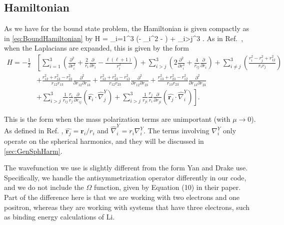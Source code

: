 \documentclass[Dissertation.tex]{subfiles}
\begin{document}
\subsection{Hamiltonian}
\label{sec:GenShortHam}
As we have for the bound state problem, the Hamiltonian is given compactly
as in \cref{eq:BoundHamiltonian} by
\beq
\label{eq:GenHam1}
H = \sum_{i=1}^3 \left(- \nabla_i^2 -  \right) + \sum_{i>j}^3 .
\eeq
As in Ref.~\cite{Yan1997}, when the Laplacians are expanded, this is given by
the form
\begin{align}
\label{eq:GenHam2}
\nonumber H = -\frac{1}{2} & \left[ \sum_{i=1}^3 \left( \frac{\partial^2}{\partial r_i^2} + \frac{2}{r_i} \frac{\partial}{\partial r_i} - \frac{\ell(\ell+1)}{r_i^2} \right) + \sum_{i>j}^3 \left( 2 \frac{\partial^2}{\partial r_i^2} + \frac{4}{r_{ij}} \frac{\partial}{\partial r_i} \right) + \sum_{i \neq j}^3 \left(\frac{r_i^2 - r_j^2 + r_{12}^2}{r_i r_j} \right) \right. \\
\nonumber &  \left. + \frac{r_{12}^2 + r_{13}^2 - r_{23}^2}{r_{12} r_{13}} \frac{\partial^2}{\partial r_{12} \partial r_{13}} + \frac{r_{12}^2 + r_{23}^2 - r_{13}^2}{r_{12} r_{23}} \frac{\partial^2}{\partial r_{12} \partial r_{23}} + \frac{r_{13}^2 + r_{23}^2 - r_{12}^2}{r_{13} r_{23}} \frac{\partial^2}{\partial r_{13} \partial r_{23}} \right. \\
& \left. + \sum_{i>j}^3 \frac{1}{r_{ij}} \frac{r_i}{r_j} \frac{\partial}{\partial r_{ij}} \left( \hat{\boldsymbol{r}_i} \cdot \hat{\nabla}_j^Y \right) + \sum_{i>j}^3 \frac{1}{r_{ji}} \frac{r_j}{r_i} \frac{\partial}{\partial r_{ji}} \left( \hat{\boldsymbol{r}_j} \cdot \hat{\nabla}_i^Y \right) \right].
\end{align}

\noindent This is the form when the mass polarization terms are unimportant
(with $\mu \rightarrow 0$). As defined in Ref. \cite{Yan1997},
$\hat{\boldsymbol{r}_j} = \boldsymbol{r}_i/r_i$ and $\hat{\nabla}_i^Y = r_i \nabla_i^Y$.
The terms involving $\nabla_i^Y$ only operate on the spherical 
harmonics, and they will be discussed in \cref{sec:GenSphHarm}.

The wavefunction we use is slightly different from the form Yan and Drake \cite{Yan1997}
use. Specifically, we handle the antisymmetrization operator differently in 
our code, and we do not include the $\Omega$ function, given by Equation (10) 
in their paper. Part of the difference here is that we are working with two 
electrons and one positron, whereas they are working with systems that have 
three electrons, such as binding energy calculations of Li.
\end{document}
